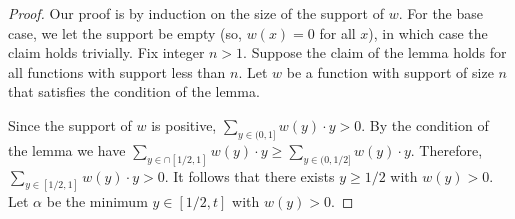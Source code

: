 \documentclass[11pt]{article}
\begin{document}
\label{app:middle region}
\begin{proof}
  Our proof is by induction on the size of the support of $w$.  For
  the base case, we let the support be empty (so, $w(x) = 0$ for all
  $x$), in which case the claim holds trivially.  Fix integer $n > 1$.
  Suppose the claim of the lemma holds for all functions with
  support less than $n$.  Let $w$ be a function with support of
  size $n$ that satisfies the condition of the lemma.

  Since the support of $w$ is positive, $\sum_{y \in (0,1]}
    w(y) \cdot y > 0.$  By the condition of the lemma we have $\sum_{y \in
      \cap [1/2,1]} w(y) \cdot y \ge \sum_{y \in (0,1/2]} w(y) \cdot
    y.$  Therefore, $\sum_{y \in [1/2,1]} w(y) \cdot y > 0.$  It
    follows that there exists $y \ge 1/2$ with $w(y) > 0$.  Let
    $\alpha$ be the minimum $y \in [1/2, t]$ with $w(y) > 0$.


\end{proof}
\end{document}
